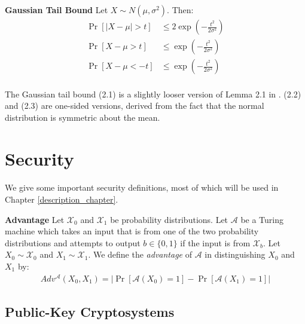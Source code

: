 \begin{lemma}{\textbf{Gaussian Tail Bound}}
Let $X \sim N(\mu, \sigma^2)$. Then:
\begin{align}
    \Pr[|X - \mu| > t] &\leq 2 \exp{(-\frac{t^2}{2 \sigma^2})}\\
    \Pr[X - \mu > t] &\leq \exp{(-\frac{t^2}{2 \sigma^2})}\\
    \Pr[X - \mu < -t] &\leq \exp{(-\frac{t^2}{2 \sigma^2})}
\end{align}
\end{lemma}

\paragraph{}
The Gaussian tail bound (2.1) is a slightly looser version of Lemma 2.1 in \cite{samorodnitsky1991probability}. (2.2) and (2.3) are one-sided versions, derived from the fact that the normal distribution is symmetric about the mean.

\section{Security}

\paragraph{}
We give some important security definitions, most of which will be used in Chapter \ref{description_chapter}.

\theoremstyle{definition}
\begin{definition}{\textbf{Advantage}}
Let $\mathcal{X}_0$ and $\mathcal{X}_1$ be probability distributions. Let $\mathcal{A}$ be a Turing machine which takes an input that is from one of the two probability distributions and attempts to output $b \in \{0, 1\}$ if the input is from $\mathcal{X}_b$. Let $X_0 \sim \mathcal{X}_0$ and $X_1 \sim \mathcal{X}_1$. We define the \textit{advantage} of $\mathcal{A}$ in distinguishing $X_0$ and $X_1$ by:
\begin{align*}
    Adv^\mathcal{A}(X_0, X_1) = |\Pr[\mathcal{A}(X_0) = 1] - \Pr[\mathcal{A}(X_1) = 1]|
\end{align*}
\end{definition}

\subsection{Public-Key Cryptosystems}

